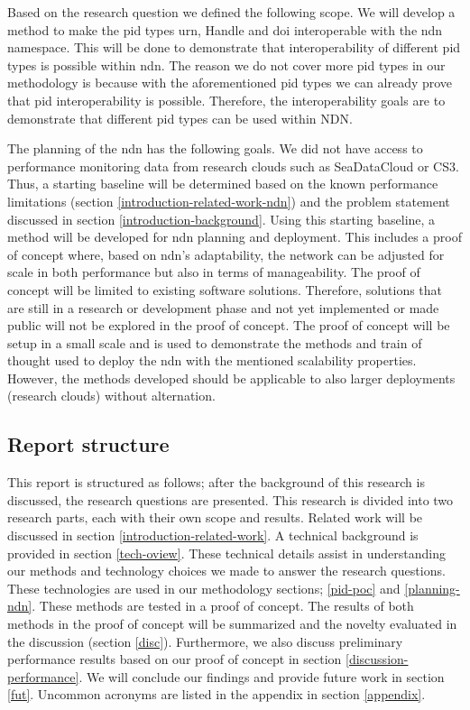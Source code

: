 
Based on the research question we defined the following scope. We will develop a method to make the \gls{pid} types \gls{urn}, Handle and \gls{doi} interoperable with the \gls{ndn} namespace. This will be done to demonstrate that interoperability of different \gls{pid} types is possible within \gls{ndn}. The reason we do not cover more \gls{pid} types in our methodology is because with the aforementioned \gls{pid} types we can already prove that \gls{pid} interoperability is possible. Therefore, the interoperability goals are to demonstrate that different \gls{pid} types can be used within NDN.

The planning of the \gls{ndn} has the following goals. We did not have access to performance monitoring data from research clouds such as SeaDataCloud or CS3. Thus, a starting baseline will be determined based on the known performance limitations (section \ref{introduction-related-work-ndn}) and the problem statement discussed in section \ref{introduction-background}. Using this starting baseline, a method will be developed for \gls{ndn} planning and deployment. This includes a proof of concept where, based on \gls{ndn}'s adaptability, the network can be adjusted for scale in both performance but also in terms of manageability. The proof of concept will be limited to existing software solutions. Therefore, solutions that are still in a research or development phase and not yet implemented or made public will not be explored in the proof of concept. The proof of concept will be setup in a small scale and is used to demonstrate the methods and train of thought used to deploy the \gls{ndn} with the mentioned scalability properties. However, the methods developed should be applicable to also larger deployments (research clouds) without alternation.

\subsection{Report structure}
This report is structured as follows; after the background of this research is discussed, the research questions are presented. This research is divided into two research parts, each with their own scope and results. Related work will be discussed in section \ref{introduction-related-work}. A technical background is provided in section \ref{tech-oview}. These technical details assist in understanding our methods and technology choices we made to answer the research questions. These technologies are used in our methodology sections; \ref{pid-poc} and \ref{planning-ndn}. These methods are tested in a proof of concept. The results of both methods in the proof of concept will be summarized and the novelty evaluated in the discussion (section \ref{disc}). Furthermore, we also discuss preliminary performance results based on our proof of concept in section \ref{discussion-performance}. We will conclude our findings and provide future work in section \ref{fut}. Uncommon acronyms are listed in the appendix in section \ref{appendix}.



